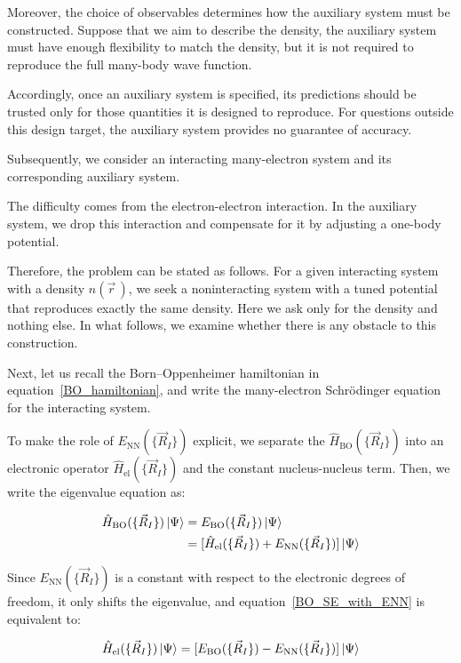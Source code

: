 Moreover, the choice of observables determines how the auxiliary system must be constructed.
Suppose that we aim to describe the density, the auxiliary system must have enough flexibility to match the density, but it is not required to reproduce the full many-body wave function.

Accordingly, once an auxiliary system is specified, its predictions should be trusted only for those quantities it is designed to reproduce.
For questions outside this design target, the auxiliary system provides no guarantee of accuracy.

Subsequently, we consider an interacting many-electron system and its corresponding auxiliary system.

The difficulty comes from the electron-electron interaction.
In the auxiliary system, we drop this interaction and compensate for it by adjusting a one-body potential.

Therefore, the problem can be stated as follows.
For a given interacting system with a density $n(\vec{r}\,)$, we seek a noninteracting system with a tuned potential that reproduces exactly the same density.
Here we ask only for the density and nothing else.
In what follows, we examine whether there is any obstacle to this construction.

Next, let us recall the Born--Oppenheimer hamiltonian in equation~\eqref{BO_hamiltonian}, 
and write the many-electron Schrödinger equation for the interacting system.

To make the role of $E_\mathrm{NN}(\{\vec{R}_I\})$ explicit,
we separate the $\hat{H}_\mathrm{BO}(\{\vec{R}_I\})$ into an electronic operator $\hat{H}_\mathrm{el}(\{\vec{R}_I\})$ and the constant nucleus-nucleus term.
Then, we write the eigenvalue equation as:

\begin{equation}
\begin{aligned}
    \hat{H}_\mathrm{BO}(\{\vec{R}_I\})\ket{\Psi}
    &= E_\mathrm{BO}(\{\vec{R}_I\})\ket{\Psi} \\
    &= [\hat{H}_\mathrm{el}(\{\vec{R}_I\}) + E_\mathrm{NN}(\{\vec{R}_I\})]\ket{\Psi}
\end{aligned}
\label{BO_SE_with_ENN}
\end{equation}

Since $E_\mathrm{NN}(\{\vec{R}_I\})$ is a constant with respect to the electronic degrees of freedom, it only shifts the eigenvalue, and equation~\eqref{BO_SE_with_ENN} is equivalent to:

\begin{equation}
    \hat{H}_\mathrm{el}(\{\vec{R}_I\})\ket{\Psi}
    = [E_\mathrm{BO}(\{\vec{R}_I\}) - E_\mathrm{NN}(\{\vec{R}_I\})]\ket{\Psi}
\label{BO_SE_shift_ENN}
\end{equation}

